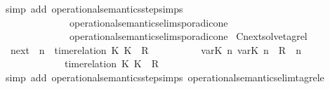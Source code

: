 \begin{isabellebody}
%
\isadelimproof
%
\endisadelimproof
%
\isatagproof
{}\isamarkupfalse%
\ {\isacharparenleft}simp\ add{\isacharcolon}\ operational{\isacharunderscore}semantics{\isacharunderscore}step{\isachardot}simps\isanewline
\ \ \ \ \ \ \ \ \ \ \ \ \ \ operational{\isacharunderscore}semantics{\isacharunderscore}elim{\isachardot}sporadic{\isacharunderscore}on{\isacharunderscore}e{}\isanewline
\ \ \ \ \ \ \ \ \ \ \ \ \ \ operational{\isacharunderscore}semantics{\isacharunderscore}elim{\isachardot}sporadic{\isacharunderscore}on{\isacharunderscore}e{}{\isacharparenright}%
\endisatagproof
{\isafoldproof}%
%
\isadelimproof
\isanewline
%
\endisadelimproof
\isanewline
{}\isamarkupfalse%
\ Cnext{\isacharunderscore}solve{\isacharunderscore}tagrel{\isacharcolon}\isanewline
\ \ {\isacartoucheopen}{\isacharparenleft}{\isasymC}\isactrlsub n\isactrlsub e\isactrlsub x\isactrlsub t\ {\isacharparenleft}{\isasymGamma}{\isacharcomma}\ n\ {\isasymturnstile}\ {\isacharparenleft}{\isacharparenleft}time{\isacharminus}relation\ {\isasymlfloor}K\ K\ {\isasymin}\ R{\isacharparenright}\ {\isacharhash}\ {\isasymPsi}{\isacharparenright}\ {\isasymtriangleright}\ {\isasymPhi}{\isacharparenright}{\isacharparenright}\isanewline
\ \ \ \ {\isasymsupseteq}\ {\isacharbraceleft}\ {\isacharparenleft}{\isacharparenleft}{\isasymlfloor}{\isasymtau}\isactrlsub v\isactrlsub a\isactrlsub r{\isacharparenleft}K\ n{\isacharparenright}{\isacharcomma}\ {\isasymtau}\isactrlsub v\isactrlsub a\isactrlsub r{\isacharparenleft}K\ n{\isacharparenright}{\isasymrfloor}\ {\isasymin}\ R{\isacharparenright}\ {\isacharhash}\ {\isasymGamma}{\isacharparenright}{\isacharcomma}n\isanewline
\ \ \ \ \ \ \ \ \ \ {\isasymturnstile}\ {\isasymPsi}\ {\isasymtriangleright}\ {\isacharparenleft}{\isacharparenleft}time{\isacharminus}relation\ {\isasymlfloor}K\ K\ {\isasymin}\ R{\isacharparenright}\ {\isacharhash}\ {\isasymPhi}{\isacharparenright}\ {\isacharbraceright}{\isacartoucheclose}\isanewline
%
\isadelimproof
%
\endisadelimproof
%
\isatagproof
{}\isamarkupfalse%
\ {\isacharparenleft}simp\ add{\isacharcolon}\ operational{\isacharunderscore}semantics{\isacharunderscore}step{\isachardot}simps\ operational{\isacharunderscore}semantics{\isacharunderscore}elim{\isachardot}tagrel{\isacharunderscore}e{\isacharparenright}%
\endisatagproof
{\isafoldproof}%

\end{isabellebody}
